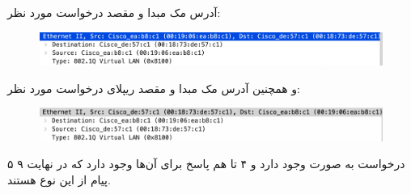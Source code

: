 \Question{}
{
	\SubQuestion{}
	{
		آدرس مک مبدا و مقصد درخواست مورد نظر:
		\begin{figure}[H]
			\centering
			\includegraphics[width=0.7\columnwidth]{Images/mac_1}
			\label{fig:mac1}
		\end{figure}
		و همچنین آدرس مک مبدا و مقصد ریپلای درخواست مورد نظر:
		\begin{figure}[H]
			\centering
			\includegraphics[width=0.7\columnwidth]{Images/mac_2}
			\label{fig:mac2}
		\end{figure}
	}
	\SubQuestion{}
	{
		۵ درخواست به صورت 
		وجود دارد و ۴ تا هم پاسخ برای آن‌ها وجود دارد که در نهایت ۹ پیام از این نوع هستند.
 }
}
